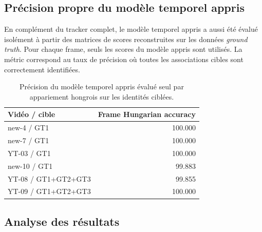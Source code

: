 \documentclass[11pt,a4paper]{article}
\begin{document}
\subsection{Précision propre du modèle temporel appris}

En complément du tracker complet, le modèle temporel appris a aussi été évalué isolément à partir des matrices de scores reconstruites sur les données \textit{ground truth}. Pour chaque frame, seuls les scores du modèle appris sont utilisés. La métric correspond au taux de précision où toutes les associations cibles sont correctement identifiées.

\begin{table}[H]
\centering
\begin{tabular}{l r}
\toprule
\textbf{Vidéo / cible} & \textbf{Frame Hungarian accuracy} \\
\midrule
new-4 / GT1 & 100.000 \\
new-7 / GT1 & 100.000 \\
YT-03 / GT1 & 100.000 \\
new-10 / GT1 & 99.883 \\
YT-08 / GT1+GT2+GT3 & 99.855 \\
YT-09 / GT1+GT2+GT3 & 100.000 \\
\bottomrule
\end{tabular}
\caption{Précision du modèle temporel appris évalué seul par appariement hongrois sur les identités ciblées.}
\end{table}

\subsection{Analyse des résultats}
\end{document}
